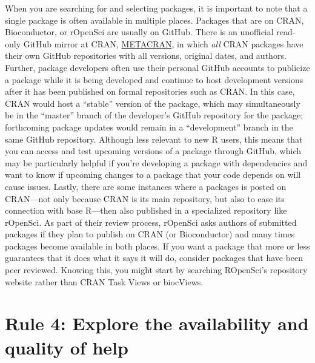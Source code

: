 \documentclass[10pt,letterpaper]{article}
\begin{document}
When you are searching for and selecting packages, it is important to
note that a single package is often available in multiple places.
Packages that are on CRAN, Bioconductor, or rOpenSci are usually on
GitHub. There is an unofficial read-only GitHub mirror at CRAN,
\href{https://github.com/cran}{METACRAN}, in which \emph{all} CRAN
packages have their own GitHub repositories with all versions, original
dates, and authors. Further, package developers often use their personal
GitHub accounts to publicize a package while it is being developed and
continue to host development versions after it has been published on
formal repositories such as CRAN. In this case, CRAN would host a
``stable'' version of the package, which may simultaneously be in the
``master'' branch of the developer's GitHub repository for the package;
forthcoming package updates would remain in a ``development'' branch in
the same GitHub repository. Although less relevant to new R users, this
means that you can access and test upcoming versions of a package
through GitHub, which may be particularly helpful if you're developing a
package with dependencies and want to know if upcoming changes to a
package that your code depends on will cause issues. Lastly, there are
some instances where a packages is posted on CRAN---not only because
CRAN is its main repository, but also to ease its connection with base
R---then also published in a specialized repository like rOpenSci. As
part of their review process, rOpenSci asks authors of submitted
packages if they plan to publish on CRAN (or Bioconductor) and many
times packages become available in both places. If you want a package
that more or less guarantees that it does what it says it will do,
consider packages that have been peer reviewed. Knowing this, you might
start by searching ROpenSci's repository website rather than CRAN Task
Views or biocViews.

\hypertarget{rule-4-explore-the-availability-and-quality-of-help}{%
\section{Rule 4: Explore the availability and quality of
help}\label{rule-4-explore-the-availability-and-quality-of-help}}
\end{document}
